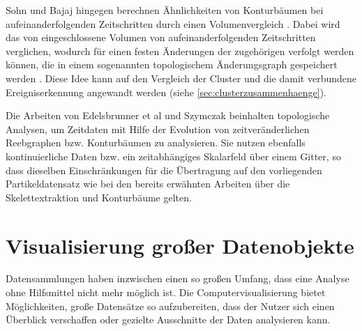Sohn und Bajaj hingegen berechnen Ähnlichkeiten von Konturbäumen bei aufeinanderfolgenden Zeitschritten durch einen Volumenvergleich \cite{silver1997trackingTurbulent3DFeatures}. Dabei wird das von  eingeschlossene Volumen von aufeinanderfolgenden Zeitschritten verglichen, wodurch für einen festen  Änderungen der zugehörigen  verfolgt werden können, die in einem sogenannten topologischem Änderungsgraph gespeichert werden \cite{sohn2006timeVaryingContourTopology}. Diese Idee kann auf den Vergleich der Cluster und die damit verbundene Ereigniserkennung angewandt werden (siehe \autoref{sec:clusterzusammenhaenge}).

Die Arbeiten von Edelsbrunner et al \cite{edelsbrunner2004timeVaryingReebGraphs} und Szymczak \cite{szymczak2005contourEvolutionInTimeDependentScalarFields} beinhalten topologische Analysen, um Zeitdaten mit Hilfe der Evolution von zeitveränderlichen Reebgraphen bzw. Konturbäumen zu analysieren. Sie nutzen ebenfalls kontinuierliche Daten bzw. ein zeitabhängiges Skalarfeld über einem Gitter, so dass dieselben Einschränkungen für die Übertragung auf den vorliegenden Partikeldatensatz wie bei den bereits erwähnten Arbeiten über die Skelettextraktion und Konturbäume gelten.

\section{Visualisierung großer Datenobjekte}\label{sec:related-vis}


Datensammlungen haben inzwischen einen so großen Umfang, dass eine Analyse ohne Hilfsmittel nicht mehr möglich ist. Die Computervisualisierung bietet Möglichkeiten, große Datensätze so aufzubereiten, dass der Nutzer sich einen Überblick verschaffen oder gezielte Ausschnitte der Daten analysieren kann.

